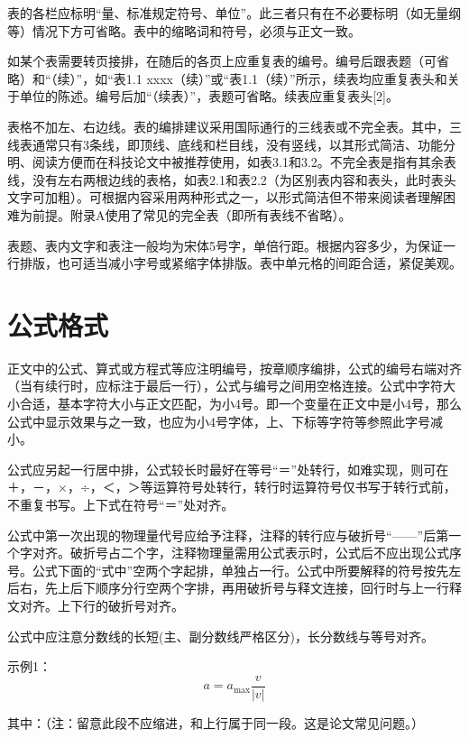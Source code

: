 表的各栏应标明“量、标准规定符号、单位”。此三者只有在不必要标明（如无量纲等）情况下方可省略。表中的缩略词和符号，必须与正文一致。

如某个表需要转页接排，在随后的各页上应重复表的编号。编号后跟表题（可省略）和“（续）”，如“表1.1 xxxx（续）”或“表1.1（续）”所示，续表均应重复表头和关于单位的陈述。编号后加“（续表）”，表题可省略。续表应重复表头[2]。
 
表格不加左、右边线。表的编排建议采用国际通行的三线表或不完全表。其中，三线表通常只有3条线，即顶线、底线和栏目线，没有竖线，以其形式简洁、功能分明、阅读方便而在科技论文中被推荐使用，如表3.1和3.2。不完全表是指有其余表线，没有左右两根边线的表格，如表2.1和表2.2（为区别表内容和表头，此时表头文字可加粗）。可根据内容采用两种形式之一，以形式简洁但不带来阅读者理解困难为前提。附录A使用了常见的完全表（即所有表线不省略）。

表题、表内文字和表注一般均为宋体5号字，单倍行距。根据内容多少，为保证一行排版，也可适当减小字号或紧缩字体排版。表中单元格的间距合适，紧促美观。

\section{公式格式}
正文中的公式、算式或方程式等应注明编号，按章顺序编排，公式的编号右端对齐（当有续行时，应标注于最后一行），公式与编号之间用空格连接。公式中字符大小合适，基本字符大小与正文匹配，为小4号。即一个变量在正文中是小4号，那么公式中显示效果与之一致，也应为小4号字体，上、下标等字符等参照此字号减小。

公式应另起一行居中排，公式较长时最好在等号“＝”处转行，如难实现，则可在＋，－，×，÷，＜，＞等运算符号处转行，转行时运算符号仅书写于转行式前，不重复书写。上下式在符号“＝”处对齐。

公式中第一次出现的物理量代号应给予注释，注释的转行应与破折号“——”后第一个字对齐。破折号占二个字，注释物理量需用公式表示时，公式后不应出现公式序号。公式下面的“式中”空两个字起排，单独占一行。公式中所要解释的符号按先左后右，先上后下顺序分行空两个字排，再用破折号与释文连接，回行时与上一行释文对齐。上下行的破折号对齐。

公式中应注意分数线的长短(主、副分数线严格区分)，长分数线与等号对齐。


示例1：
\begin{equation}
    a = {a_{\max }}\frac{v}{{\left| v \right|}}  \label{gongshi3.1}  %
\end{equation}

其中：（注：留意此段不应缩进，和上行属于同一段。这是论文常见问题。）

